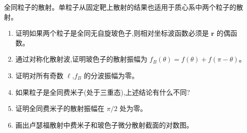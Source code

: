\begin{question}
全同粒子的散射。单粒子从固定靶上散射的结果也适用于质心系中两个粒子的散射。
\begin{enumerate}
\item 证明如果两个粒子是全同无自旋玻色子,则相对坐标波函数必须是 $\mathbf r$ 的偶函数。
\item 通过对称化散射波,证明玻色子的散射振幅为 $f_B(\theta)=f(\theta)+f(\pi-\theta)$。
\item 证明对所有奇数 $\ell$,$f_B$ 的分波振幅为零。
\item 如果粒子是全同费米子(处于三重态),上述结论有什么不同?
\item 证明全同费米子的散射振幅在 $\pi/2$ 处为零。
\item 画出卢瑟福散射中费米子和玻色子微分散射截面的对数图。
\end{enumerate}
\end{question}
